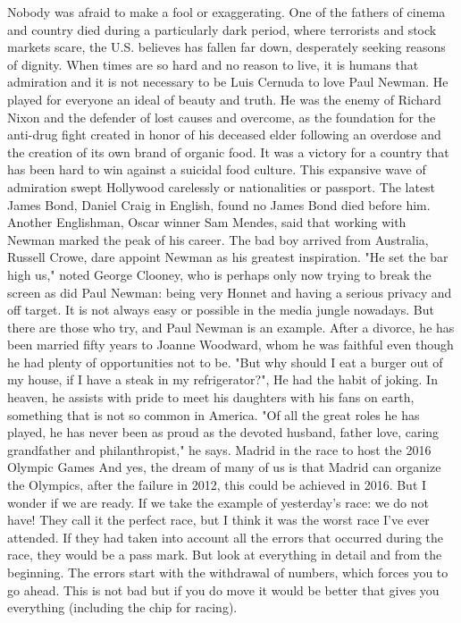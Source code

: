 Nobody was afraid to make a fool or exaggerating.
One of the fathers of cinema and country died during a particularly dark period, where terrorists and stock markets scare, the U.S. believes has fallen far down, desperately seeking reasons of dignity.
When times are so hard and no reason to live, it is humans that admiration and it is not necessary to be Luis Cernuda to love Paul Newman.
He played for everyone an ideal of beauty and truth.
He was the enemy of Richard Nixon and the defender of lost causes and overcome, as the foundation for the anti-drug fight created in honor of his deceased elder following an overdose and the creation of its own brand of organic food.
It was a victory for a country that has been hard to win against a suicidal food culture.
This expansive wave of admiration swept Hollywood carelessly or nationalities or passport.
The latest James Bond, Daniel Craig in English, found no James Bond died before him.
Another Englishman, Oscar winner Sam Mendes, said that working with Newman marked the peak of his career.
The bad boy arrived from Australia, Russell Crowe, dare appoint Newman as his greatest inspiration.
"He set the bar high us," noted George Clooney, who is perhaps only now trying to break the screen as did Paul Newman: being very Honnet and having a serious privacy and off target.
It is not always easy or possible in the media jungle nowadays.
But there are those who try, and Paul Newman is an example.
After a divorce, he has been married fifty years to Joanne Woodward, whom he was faithful even though he had plenty of opportunities not to be.
"But why should I eat a burger out of my house, if I have a steak in my refrigerator?", He had the habit of joking.
In heaven, he assists with pride to meet his daughters with his fans on earth, something that is not so common in America.
"Of all the great roles he has played, he has never been as proud as the devoted husband, father love, caring grandfather and philanthropist," he says.
Madrid in the race to host the 2016 Olympic Games
And yes, the dream of many of us is that Madrid can organize the Olympics, after the failure in 2012, this could be achieved in 2016.
But I wonder if we are ready.
If we take the example of yesterday's race: we do not have!
They call it the perfect race, but I think it was the worst race I've ever attended.
If they had taken into account all the errors that occurred during the race, they would be a pass mark.
But look at everything in detail and from the beginning.
The errors start with the withdrawal of numbers, which forces you to go ahead.
This is not bad but if you do move it would be better that gives you everything (including the chip for racing).
